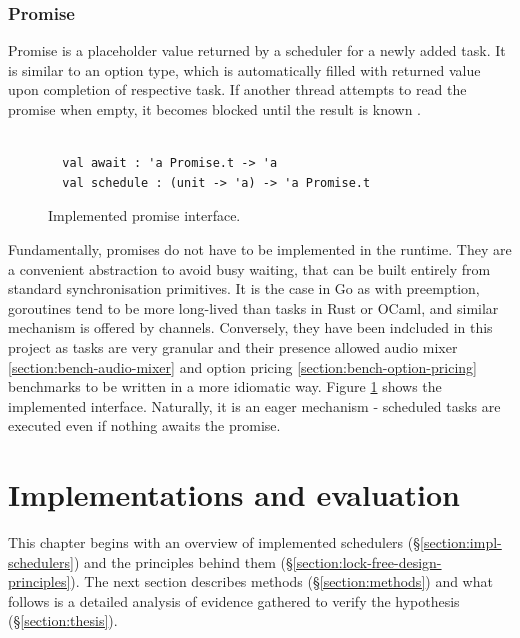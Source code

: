 \documentclass[12pt,a4paper,twoside]{report}
\begin{document}
\subsection{Promise}
\label{section:promise}
Promise is a placeholder value returned by a scheduler for a newly added task. It is similar to an option type, which is automatically filled with returned value upon completion of respective task. If another thread attempts to read the promise when empty, it becomes blocked until the result is known \cite{Swalens2014}. 

\begin{figure}
    \centering
    \begin{verbatim}

  val await : 'a Promise.t -> 'a
  val schedule : (unit -> 'a) -> 'a Promise.t
    \end{verbatim}
    \caption{Implemented promise interface.}
    \label{fig:promise-interface}
\end{figure}


Fundamentally, promises do not have to be implemented in the runtime. They are a convenient abstraction to avoid busy waiting, that can be built entirely from standard synchronisation primitives. It is the case in Go \cite{chebyras74:online} as with preemption, goroutines tend to be more long-lived than tasks in Rust or OCaml, and similar mechanism is offered by channels. Conversely, they have been indcluded in this project as tasks are very granular and their presence allowed audio mixer \ref{section:bench-audio-mixer} and option pricing \ref{section:bench-option-pricing} benchmarks to be written in a more idiomatic way. Figure \ref{fig:promise-interface} shows the implemented interface. Naturally, it is an eager mechanism - scheduled tasks are executed even if nothing awaits the promise. 


\chapter{Implementations and evaluation}
\label{chapter:evaluation}

This chapter begins with an overview of implemented schedulers (\S\ref{section:impl-schedulers}) and the principles behind them (\S\ref{section:lock-free-design-principles}). The next section describes methods (\S\ref{section:methods}) and what follows is a detailed analysis of evidence gathered to verify the hypothesis (\S\ref{section:thesis}). 
\end{document}
